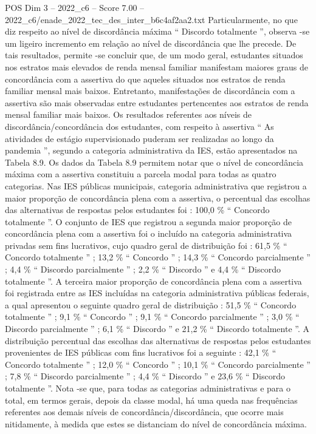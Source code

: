 \begin{textsample}{POS Dim 3 – 2022\_c6 – Score 7.00 – 2022\_c6/enade\_2022\_tec\_des\_inter\_b6c4af2aa2.txt}
Particularmente, no que diz respeito ao nível de discordância máxima “ Discordo totalmente ”, observa -se um ligeiro incremento em relação ao nível de discordância que lhe precede.
De tais resultados, permite -se concluir que, de um modo geral, estudantes situados nos estratos mais elevados de renda mensal familiar manifestam maiores graus de concordância com a assertiva do que aqueles situados nos estratos de renda familiar mensal mais baixos.
Entretanto, manifestações de discordância com a assertiva são mais observadas entre estudantes pertencentes aos estratos de renda mensal familiar mais baixos.
Os resultados referentes aos níveis de discordância/concordância dos estudantes, com respeito à assertiva “ As atividades de estágio supervisionado puderam ser realizadas ao longo da pandemia ”, segundo a categoria administrativa da IES, estão apresentados na Tabela 8.9.
Os dados da Tabela 8.9 permitem notar que o nível de concordância máxima com a assertiva constituiu a parcela modal para todas as quatro categorias.
Nas IES públicas municipais, categoria administrativa que registrou a maior proporção de concordância plena com a assertiva, o percentual das escolhas das alternativas de respostas pelos estudantes foi : 100,0 \% “ Concordo totalmente ”.
O conjunto de IES que registrou a segunda maior proporção de concordância plena com a assertiva foi o incluído na categoria administrativa privadas sem fins lucrativos, cujo quadro geral de distribuição foi : 61,5 \% “ Concordo totalmente ” ; 13,2 \% “ Concordo ” ; 14,3 \% “ Concordo parcialmente ” ; 4,4 \% “ Discordo parcialmente ” ; 2,2 \% “ Discordo ” e 4,4 \% “ Discordo totalmente ”.
A terceira maior proporção de concordância plena com a assertiva foi registrada entre as IES incluídas na categoria administrativa públicas federais, a qual apresentou o seguinte quadro geral de distribuição : 51,5 \% “ Concordo totalmente ” ; 9,1 \% “ Concordo ” ; 9,1 \% “ Concordo parcialmente ” ; 3,0 \% “ Discordo parcialmente ” ; 6,1 \% “ Discordo ” e 21,2 \% “ Discordo totalmente ”.
A distribuição percentual das escolhas das alternativas de respostas pelos estudantes provenientes de IES públicas com fins lucrativos foi a seguinte : 42,1 \% “ Concordo totalmente ” ; 12,0 \% “ Concordo ” ; 10,1 \% “ Concordo parcialmente ” ; 7,8 \% “ Discordo parcialmente ” ; 4,4 \% “ Discordo ” e 23,6 \% “ Discordo totalmente ”.
Nota -se que, para todas as categorias administrativas e para o total, em termos gerais, depois da classe modal, há uma queda nas frequências referentes aos demais níveis de concordância/discordância, que ocorre mais nitidamente, à medida que estes se distanciam do nível de concordância máxima.

\end{textsample}
